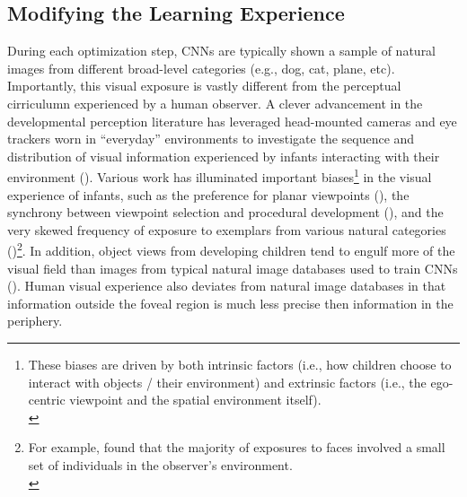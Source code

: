 \documentclass[12pt]{article}
\let\oldcite=\cite
\let\oldtextcite=\textcite
\renewcommand{\cite}[1]{\textcolor[rgb]{0, .121, .388}{\oldcite{#1}}}
\renewcommand{\textcite}[1]{\textcolor[rgb]{0, .121, .388}{\oldtextcite{#1}}}
\begin{document}
\subsection{Modifying the Learning Experience}

During each optimization step, CNNs are typically shown a sample of natural images from different broad-level categories (e.g., dog, cat, plane, etc). Importantly, this visual exposure is vastly different from the perceptual cirriculumn experienced by a human observer. A clever advancement in the developmental perception literature has leveraged head-mounted cameras and eye trackers worn in ``everyday'' environments to investigate the sequence and distribution of visual information experienced by infants interacting with their environment (\cite{smith2018developing,james2014some,james2014young}). Various work has illuminated important biases\footnote{These biases are driven by both intrinsic factors (i.e., how children choose to interact with objects / their environment) and extrinsic factors (i.e., the ego-centric viewpoint and the spatial environment itself). \\} in the visual experience of infants, such as the preference for planar viewpoints (\cite{james2014young}), the synchrony between viewpoint selection and procedural development (\cite{smith2018developing}), and the very skewed frequency of exposure to exemplars from various natural categories (\cite{jayaraman2015faces})\footnote{For example, \textcite{jayaraman2015faces} found that the majority of exposures to faces involved a small set of individuals in the observer's environment. \\}. In addition, object views from developing children tend to engulf more of the visual field than images from typical natural image databases used to train CNNs (\cite{bambach2018toddler}). Human visual experience also deviates from natural image databases in that information outside the foveal region is much less precise then information in the periphery.
\end{document}
